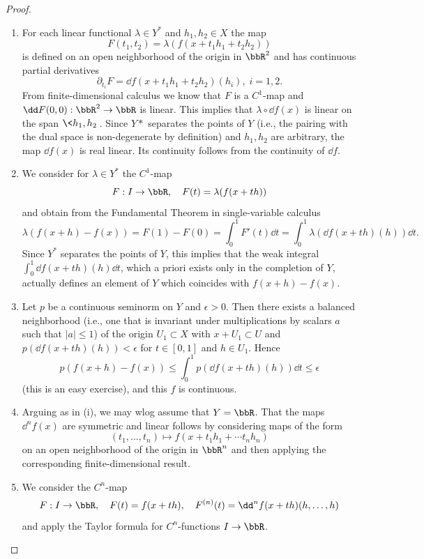 \begin{proof}
    \begin{enumerate}[label=(\roman*)]
        \item For each linear functional $\lambda\in Y^\ast$ and $h_1,h_2\in X$ the map
        \[F(t_1,t_2)=\lambda(f(x+t_1h_1+t_2h_2))\]
        is defined on an open neighborhood of the origin in $\bbR^2$ and has continuous partial derivatives 
        \[\partial_{t_i}F=\dd f(x+t_1h_1+t_2h_2)(h_i),\; i=1,2.\]
        From finite-dimensional calculus we know that $F$ is a $C^1$-map and $\dd F(0,0):\bbR^2\to \bbR$ is linear. This implies that $\lambda\circ \dd f(x)$ is linear on the span $\<h_1,h_2\>$. Since $Y\ast$ separates the points of $Y$ (i.e., the pairing with the dual space is non-degenerate by definition) and $h_1,h_2$ are arbitrary, the map $\dd f(x)$ is real linear. Its continuity follows from the continuity of $\dd f$.

        \item We consider for $\lambda \in Y^\ast$ the $C^1$-map
        \[F:I\to \bbR,\quad F(t)=\lambda(f(x+th))\]
        and obtain from the Fundamental Theorem in single-variable calculus
        \[\lambda(f(x+h)-f(x))=F(1)-F(0)=\int_0^1 F'(t)\dd t=\int_0^1 \lambda(\dd f(x+th)(h))\dd t.\]
        Since $Y^\ast$ separates the points of $Y$, this implies that the weak integral $\int_0^1 \dd f(x+th)(h)\dd t$, which a priori exists only in the completion of $Y$, actually defines an element of $Y$ which coincides with $f(x+h)-f(x)$.

        \item Let $p$ be a continuous seminorm on $Y$ and $\epsilon>0$. Then there exists a balanced neighborhood (i.e., one that is invariant under multiplications by scalars $a$ such that $|a|\leq 1$) of the origin $U_1\subset X$ with $x+U_1\subset U$ and $p(\dd f(x+th)(h))<\epsilon$ for $t\in[0,1]$ and $h\in U_1$. Hence
        \[p(f(x+h)-f(x))\leq \int_0^1 p(\dd f(x+th)(h))\dd t\leq \epsilon\]
        (this is an easy exercise), and this $f$ is continuous.
        
        \item Arguing as in (i), we may \gls{wlog} assume that $Y=\bbR$. That the maps $\dd^n f(x)$ are symmetric and linear follows by considering maps of the form
        \[(t_1,\ldots,t_n)\mapsto f(x+t_1h_1+\cdots t_nh_n)\]
        on an open neighborhood of the origin in $\bbR^n$ and then applying the corresponding finite-dimensional result.
        
        \item We consider the $C^n$-map
        \[F:I\to \bbR, \quad F(t)=f(x+th), \quad F^{(n)}(t)=\dd^n f(x+th)(h,\ldots,h)\]
        and apply the Taylor formula for $C^n$-functions $I\to \bbR$.
    \end{enumerate}
\end{proof}

